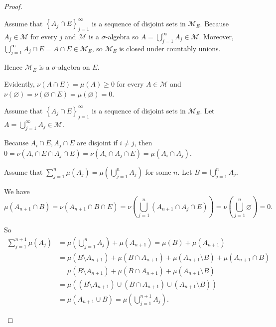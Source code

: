 \begin{proof}
\begin{enumerate}[itemsep=0pt,label={\textbf{\alph*.}}]
              Assume that \( {\left\{ A_{j} \cap E \right\}}_{j=1}^{\infty} \) is a sequence of disjoint sets in \( \mathcal{M}_{E} \). Because \( A_{j} \in \mathcal{M} \) for every \( j \) and \( \mathcal{M} \) is a \( \sigma \)-algebra so \( A = \bigcup_{j=1}^{\infty} A_{j} \in \mathcal{M} \). Moreover, \( \bigcup_{j=1}^{\infty} A_{j} \cap E = A \cap E \in \mathcal{M}_{E} \), so \( \mathcal{M}_{E} \) is closed under countably unions.

              Hence \( \mathcal{M}_{E} \) is a \( \sigma \)-algebra on \( E \).

              \bigskip

              Evidently, \( \nu(A \cap E) = \mu(A) \ge 0 \) for every \( A \in \mathcal{M} \) and \( \nu(\varnothing) = \nu(\varnothing \cap E) = \mu(\varnothing) = 0 \).

              Assume that \( {\left\{ A_{j} \cap E \right\}}_{j=1}^{\infty} \) is a sequence of disjoint sets in \( \mathcal{M}_{E} \). Let \( A = \bigcup_{j=1}^{\infty} A_{j} \in \mathcal{M} \).

              Because \( A_{i} \cap E, A_{j} \cap E \) are disjoint if \( i \ne j \), then \( 0 = \nu(A_{i} \cap E \cap A_{j} \cap E) = \nu(A_{i} \cap A_{j} \cap E) = \mu(A_{i} \cap A_{j}) \).

              Assume that \( \sum_{j=1}^{n} \mu(A_{j}) = \mu\left( \bigcup_{j=1}^{n} A_{j} \right) \) for some \( n \). Let \( B = \bigcup_{j=1}^{n} A_{j} \).

              We have
              \[
                  \mu(A_{n+1} \cap B) = \nu(A_{n+1} \cap B \cap E) = \nu\left( \bigcup_{j=1}^{n} (A_{n+1} \cap A_{j} \cap E) \right) = \nu\left( \bigcup_{j=1}^{n} \varnothing \right) = 0.
              \]

              So
              \begingroup
              \allowdisplaybreaks
              \begin{align*}
                  \sum_{j=1}^{n+1} \mu(A_{j}) & = \mu\left( \bigcup_{j=1}^{n} A_{j} \right) + \mu(A_{n+1}) = \mu(B) + \mu(A_{n+1})                \\
                                              & = \mu(B \setminus A_{n+1}) + \mu(B \cap A_{n+1}) + \mu(A_{n+1} \setminus B) + \mu(A_{n+1} \cap B) \\
                                              & =  \mu(B \setminus A_{n+1}) + \mu(B \cap A_{n+1}) + \mu(A_{n+1} \setminus B)                      \\
                                              & = \mu\left( (B \setminus A_{n+1}) \cup (B \cap A_{n+1}) \cup (A_{n+1} \setminus B) \right)        \\
                                              & = \mu(A_{n+1} \cup B) = \mu\left( \bigcup_{j=1}^{n+1} A_{j} \right).
              \end{align*}
              \endgroup


\end{enumerate}
\end{proof}
